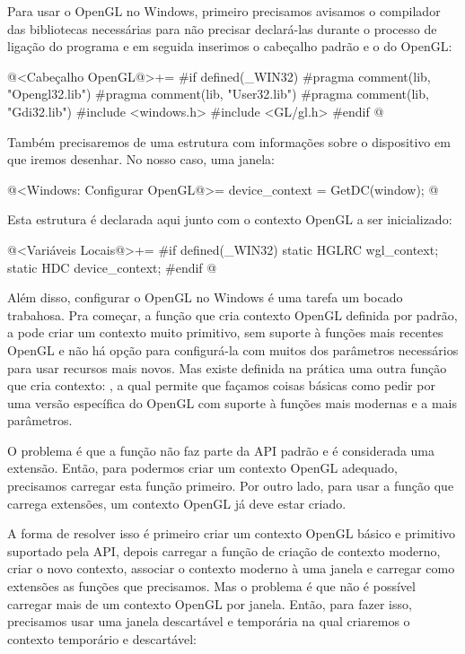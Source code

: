 Para usar o OpenGL no Windows, primeiro precisamos avisamos o
compilador das bibliotecas necessárias para não precisar declará-las
durante o processo de ligação do programa e em seguida inserimos o
cabeçalho padrão e o do OpenGL:

\iniciocodigo
@<Cabeçalho OpenGL@>+=
#if defined(_WIN32)
#pragma comment(lib, "Opengl32.lib")
#pragma comment(lib, "User32.lib")
#pragma comment(lib, "Gdi32.lib")
#include <windows.h>
#include <GL/gl.h>
#endif
@
\fimcodigo

Também precisaremos de uma estrutura com informações sobre o
dispositivo em que iremos desenhar. No nosso caso, uma janela:

\iniciocodigo
@<Windows: Configurar OpenGL@>=
device_context = GetDC(window);
@
\fimcodigo

Esta estrutura é declarada aqui junto com o contexto OpenGL a ser
inicializado:

\iniciocodigo
@<Variáveis Locais@>+=
#if defined(_WIN32)
static HGLRC wgl_context;
static HDC device_context;
#endif
@
\fimcodigo


Além disso, configurar o OpenGL no Windows é uma tarefa um bocado
trabahosa. Pra começar, a função que cria contexto OpenGL definida por
padrão, a  pode criar um contexto muito
primitivo, sem suporte à funções mais recentes OpenGL e não há opção
para configurá-la com muitos dos parâmetros necessários para usar
recursos mais novos. Mas existe definida na prática uma outra função
que cria contexto: , a qual
permite que façamos coisas básicas como pedir por uma versão
específica do OpenGL com suporte à funções mais modernas e a mais
parâmetros.

O problema é que a função  não
faz parte da API padrão e é considerada uma extensão. Então, para
podermos criar um contexto OpenGL adequado, precisamos carregar esta
função primeiro. Por outro lado, para usar a função que carrega
extensões, um contexto OpenGL já deve estar criado.

A forma de resolver isso é primeiro criar um contexto OpenGL básico e
primitivo suportado pela API, depois carregar a função de criação de
contexto moderno, criar o novo contexto, associar o contexto moderno à
uma janela e carregar como extensões as funções que precisamos. Mas o
problema é que não é possível carregar mais de um contexto OpenGL por
janela. Então, para fazer isso, precisamos usar uma janela descartável
e temporária na qual criaremos o contexto temporário e descartável:

